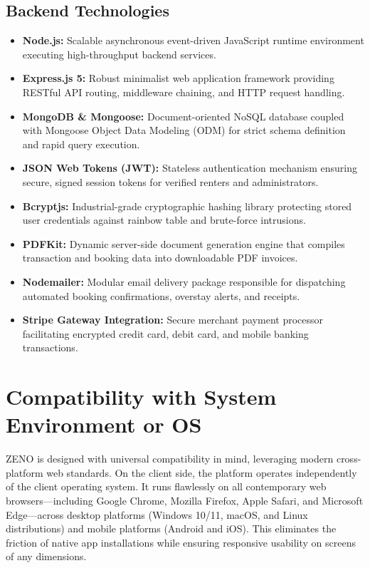 \documentclass[12pt,a4paper]{article}
\begin{document}
\subsection{Backend Technologies}
\begin{itemize}[label=--]
    \item \textbf{Node.js:} Scalable asynchronous event-driven JavaScript runtime environment executing high-throughput backend services.
    \item \textbf{Express.js 5:} Robust minimalist web application framework providing RESTful API routing, middleware chaining, and HTTP request handling.
    \item \textbf{MongoDB \& Mongoose:} Document-oriented NoSQL database coupled with Mongoose Object Data Modeling (ODM) for strict schema definition and rapid query execution.
    \item \textbf{JSON Web Tokens (JWT):} Stateless authentication mechanism ensuring secure, signed session tokens for verified renters and administrators.
    \item \textbf{Bcryptjs:} Industrial-grade cryptographic hashing library protecting stored user credentials against rainbow table and brute-force intrusions.
    \item \textbf{PDFKit:} Dynamic server-side document generation engine that compiles transaction and booking data into downloadable PDF invoices.
    \item \textbf{Nodemailer:} Modular email delivery package responsible for dispatching automated booking confirmations, overstay alerts, and receipts.
    \item \textbf{Stripe Gateway Integration:} Secure merchant payment processor facilitating encrypted credit card, debit card, and mobile banking transactions.
\end{itemize}

\section{Compatibility with System Environment or OS}

ZENO is designed with universal compatibility in mind, leveraging modern cross-platform web standards. On the client side, the platform operates independently of the client operating system. It runs flawlessly on all contemporary web browsers—including Google Chrome, Mozilla Firefox, Apple Safari, and Microsoft Edge—across desktop platforms (Windows 10/11, macOS, and Linux distributions) and mobile platforms (Android and iOS). This eliminates the friction of native app installations while ensuring responsive usability on screens of any dimensions.
\end{document}
